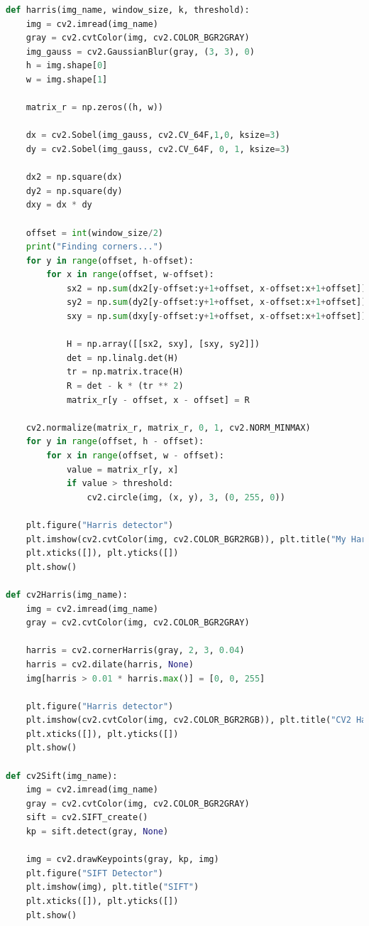 \documentclass{article}
\begin{document}
\begin{appendices}
\begin{lstlisting}[language=Python]
def harris(img_name, window_size, k, threshold):
    img = cv2.imread(img_name)
    gray = cv2.cvtColor(img, cv2.COLOR_BGR2GRAY)
    img_gauss = cv2.GaussianBlur(gray, (3, 3), 0)
    h = img.shape[0]
    w = img.shape[1]

    matrix_r = np.zeros((h, w))

    dx = cv2.Sobel(img_gauss, cv2.CV_64F,1,0, ksize=3)
    dy = cv2.Sobel(img_gauss, cv2.CV_64F, 0, 1, ksize=3)

    dx2 = np.square(dx)
    dy2 = np.square(dy)
    dxy = dx * dy

    offset = int(window_size/2)
    print("Finding corners...")
    for y in range(offset, h-offset):
        for x in range(offset, w-offset):
            sx2 = np.sum(dx2[y-offset:y+1+offset, x-offset:x+1+offset])
            sy2 = np.sum(dy2[y-offset:y+1+offset, x-offset:x+1+offset])
            sxy = np.sum(dxy[y-offset:y+1+offset, x-offset:x+1+offset])

            H = np.array([[sx2, sxy], [sxy, sy2]])
            det = np.linalg.det(H)
            tr = np.matrix.trace(H)
            R = det - k * (tr ** 2)
            matrix_r[y - offset, x - offset] = R

    cv2.normalize(matrix_r, matrix_r, 0, 1, cv2.NORM_MINMAX)
    for y in range(offset, h - offset):
        for x in range(offset, w - offset):
            value = matrix_r[y, x]
            if value > threshold:
                cv2.circle(img, (x, y), 3, (0, 255, 0))

    plt.figure("Harris detector")
    plt.imshow(cv2.cvtColor(img, cv2.COLOR_BGR2RGB)), plt.title("My Harris")
    plt.xticks([]), plt.yticks([])
    plt.show()

def cv2Harris(img_name):
    img = cv2.imread(img_name)
    gray = cv2.cvtColor(img, cv2.COLOR_BGR2GRAY)

    harris = cv2.cornerHarris(gray, 2, 3, 0.04)
    harris = cv2.dilate(harris, None)
    img[harris > 0.01 * harris.max()] = [0, 0, 255]

    plt.figure("Harris detector")
    plt.imshow(cv2.cvtColor(img, cv2.COLOR_BGR2RGB)), plt.title("CV2 Harris")
    plt.xticks([]), plt.yticks([])
    plt.show()

def cv2Sift(img_name):
    img = cv2.imread(img_name)
    gray = cv2.cvtColor(img, cv2.COLOR_BGR2GRAY)
    sift = cv2.SIFT_create()
    kp = sift.detect(gray, None)

    img = cv2.drawKeypoints(gray, kp, img)
    plt.figure("SIFT Detector")
    plt.imshow(img), plt.title("SIFT")
    plt.xticks([]), plt.yticks([])
    plt.show()


\end{lstlisting}
\end{appendices}
\end{document}
